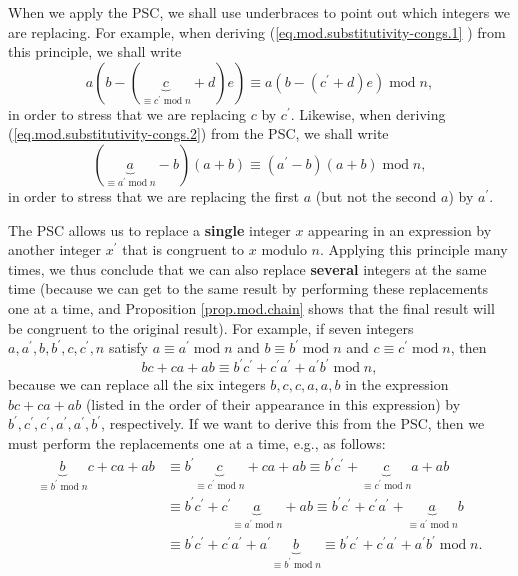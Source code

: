 \documentclass[numbers=enddot,12pt,final,onecolumn,notitlepage]{scrartcl}%
\numberwithin{exer}{subsection}
\theoremstyle{definition}
\begin{document}
When we apply the PSC, we shall use underbraces to point out which integers we
are replacing. For example, when deriving (\ref{eq.mod.substitutivity-congs.1}%
) from this principle, we shall write%
\[
a\left(  b-\left(  \underbrace{c}_{\equiv c^{\prime}\operatorname{mod}%
n}+d\right)  e\right)  \equiv a\left(  b-\left(  c^{\prime}+d\right)
e\right)  \operatorname{mod}n,
\]
in order to stress that we are replacing $c$ by $c^{\prime}$. Likewise, when
deriving (\ref{eq.mod.substitutivity-congs.2}) from the PSC, we shall write%
\[
\left(  \underbrace{a}_{\equiv a^{\prime}\operatorname{mod}n}-b\right)
\left(  a+b\right)  \equiv\left(  a^{\prime}-b\right)  \left(  a+b\right)
\operatorname{mod}n,
\]
in order to stress that we are replacing the first $a$ (but not the second
$a$) by $a^{\prime}$.

The PSC allows us to replace a \textbf{single} integer $x$ appearing in an
expression by another integer $x^{\prime}$ that is congruent to $x$ modulo
$n$. Applying this principle many times, we thus conclude that we can also
replace \textbf{several} integers at the same time (because we can get to the
same result by performing these replacements one at a time, and Proposition
\ref{prop.mod.chain} shows that the final result will be congruent to the
original result). For example, if seven integers $a,a^{\prime},b,b^{\prime
},c,c^{\prime},n$ satisfy $a\equiv a^{\prime}\operatorname{mod}n$ and $b\equiv
b^{\prime}\operatorname{mod}n$ and $c\equiv c^{\prime}\operatorname{mod}n$,
then%
\begin{equation}
bc+ca+ab\equiv b^{\prime}c^{\prime}+c^{\prime}a^{\prime}+a^{\prime}b^{\prime
}\operatorname{mod}n, \label{eq.mod.substitutivity-congs.3}%
\end{equation}
because we can replace all the six integers $b,c,c,a,a,b$ in the expression
$bc+ca+ab$ (listed in the order of their appearance in this expression) by
$b^{\prime},c^{\prime},c^{\prime},a^{\prime},a^{\prime},b^{\prime}$,
respectively. If we want to derive this from the PSC, then we must perform the
replacements one at a time, e.g., as follows:%
\begin{align*}
\underbrace{b}_{\equiv b^{\prime}\operatorname{mod}n}c+ca+ab  &  \equiv
b^{\prime}\underbrace{c}_{\equiv c^{\prime}\operatorname{mod}n}+ca+ab\equiv
b^{\prime}c^{\prime}+\underbrace{c}_{\equiv c^{\prime}\operatorname{mod}%
n}a+ab\\
&  \equiv b^{\prime}c^{\prime}+c^{\prime}\underbrace{a}_{\equiv a^{\prime
}\operatorname{mod}n}+ab\equiv b^{\prime}c^{\prime}+c^{\prime}a^{\prime
}+\underbrace{a}_{\equiv a^{\prime}\operatorname{mod}n}b\\
&  \equiv b^{\prime}c^{\prime}+c^{\prime}a^{\prime}+a^{\prime}\underbrace{b}%
_{\equiv b^{\prime}\operatorname{mod}n}\equiv b^{\prime}c^{\prime}+c^{\prime
}a^{\prime}+a^{\prime}b^{\prime}\operatorname{mod}n.
\end{align*}
\end{document}
